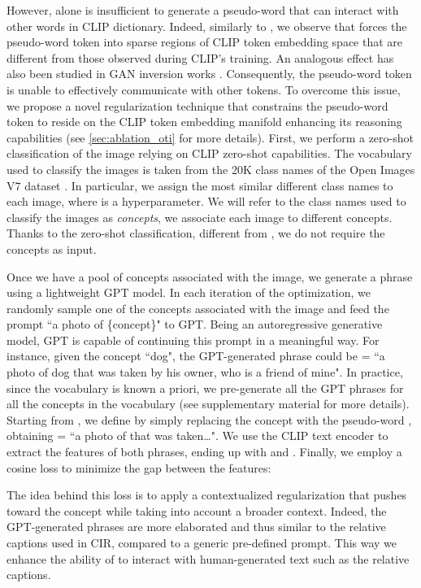 \documentclass[10pt,twocolumn,letterpaper]{article}
\begin{document}
 
However,  alone is insufficient to generate a pseudo-word that can interact with other words in CLIP dictionary. Indeed, similarly to \cite{cohen2022this}, we observe that  forces the pseudo-word token into sparse regions of CLIP token embedding space that are different from those observed during CLIP's training. An analogous effect has also been studied in GAN inversion works \cite{tov2021designing, zhu2020domain}. Consequently, the pseudo-word token is unable to effectively communicate with other tokens. To overcome this issue, we propose a novel regularization technique that constrains the pseudo-word token to reside on the CLIP token embedding manifold enhancing its reasoning capabilities (see \cref{sec:ablation_oti} for more details). First, we perform a zero-shot classification of the image  relying on CLIP zero-shot capabilities. The vocabulary used to classify the images is taken from the 20K class names of the Open Images V7 dataset \cite{kuznetsova2020open}. In particular, we assign the most similar  different class names to each image, where  is a hyperparameter. We will refer to the class names used to classify the images as \textit{concepts}, \ie we associate each image to  different concepts. Thanks to the zero-shot classification, different from \cite{cohen2022this}, we do not require the concepts as input.

Once we have a pool of concepts associated with the image, we generate a phrase using a lightweight GPT \cite{brown2020language} model. In each iteration of the optimization, we randomly sample one of the  concepts associated with the image  and feed the prompt ``a photo of \{concept\}" to GPT. Being an autoregressive generative model, GPT is capable of continuing this prompt in a meaningful way. For instance, given the concept ``dog", the GPT-generated phrase could be  = ``a photo of dog that was taken by his owner, who is a friend of mine". In practice, since the vocabulary is known a priori, we pre-generate all the GPT phrases for all the concepts in the vocabulary (see supplementary material for more details).
Starting from , we define  by simply replacing the concept with the pseudo-word , obtaining  = ``a photo of  that was taken\ldots".
We use the CLIP text encoder to extract the features of both phrases, ending up with   and .
Finally, we employ a cosine loss to minimize the gap between the features:

The idea behind this loss is to apply a contextualized regularization that pushes  toward the concept while taking into account a broader context. Indeed, the GPT-generated phrases are more elaborated and thus similar to the relative captions used in CIR, compared to a generic pre-defined prompt. This way we enhance the ability of  to interact with human-generated text such as the relative captions.
\end{document}
